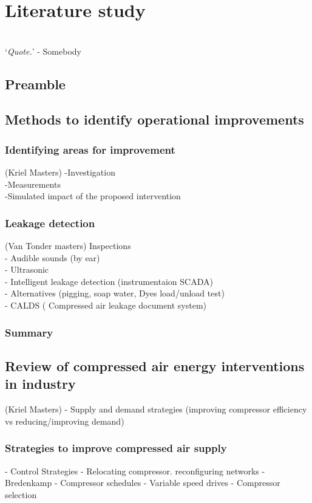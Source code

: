 \chapter{Literature study}
\vspace{38em}

\hrulefill
\\
\enquote*{\textit{Quote.}} - Somebody\\
\newpage
\section{Preamble}
\section{Methods to identify operational improvements}
\subsection{Identifying areas for improvement}
(Kriel Masters)
-Investigation\\
-Measurements\\
-Simulated impact of the proposed intervention\\

\subsection{Leakage detection}
(Van Tonder masters)
Inspections\\
- Audible sounds (by ear)\\
- Ultrasonic\\
- Intelligent leakage detection (instrumentaion SCADA)\\
- Alternatives (pigging, soap water, Dyes load/unload test)\\
-  CALDS ( Compressed air leakage document system)\\


	\subsection{Summary}
\section{Review of compressed air energy interventions in industry}
(Kriel Masters)
- Supply and demand strategies (improving compressor efficiency vs reducing/improving demand)
\subsection{Strategies to improve compressed air supply}
- Control Strategies
- Relocating compressor. reconfiguring networks - Bredenkamp
- Compressor schedules
- Variable speed drives
- Compressor selection
